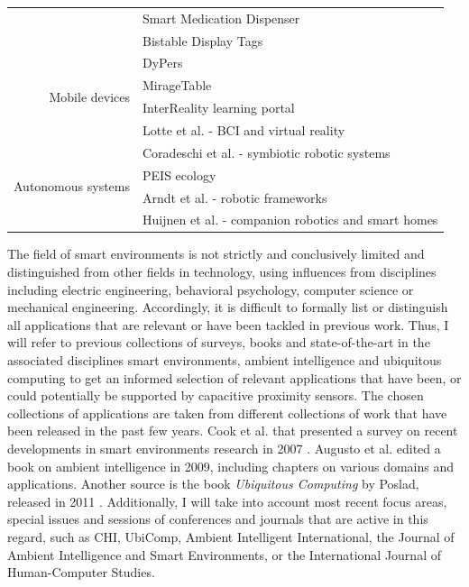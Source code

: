 \begin{table}[htbp]
\begin{tabular}{rl}
          & Smart Medication Dispenser \cite{tsai2011smart} \\
          & Bistable Display Tags \cite{dementyev2013wirelessly} \\[1em]
    \multirow{4}[0]{*}{Mobile devices} & DyPers \cite{jebara1998dypers} \\
          & MirageTable \cite{benko2012miragetable} \\
          & InterReality learning portal \cite{pena2012towards} \\
          & Lotte et al. - BCI and virtual reality \cite{lotte2013combining} \\[1em]
    \multirow{4}[0]{*}{Autonomous systems} & Coradeschi et al. - symbiotic robotic systems \cite{coradeschi2006symbiotic} \\
          & PEIS ecology \cite{broxvall2006peis} \\
          & Arndt et al. - robotic frameworks \cite{arndt2013performance} \\
          & Huijnen et al. - companion robotics and smart homes \cite{huijnen2011maybe} \\
    \bottomrule
    \end{tabular}%
  \label{tab:rel_se_apps}%
\end{table}

The field of smart environments is not strictly and conclusively limited and distinguished from other fields in technology, using influences from disciplines including electric engineering, behavioral psychology, computer science or mechanical engineering. Accordingly, it is difficult to formally list or distinguish all applications that are relevant or have been tackled in previous work. Thus, I will refer to previous collections of surveys, books and state-of-the-art in the associated disciplines smart environments, ambient intelligence and ubiquitous computing to get an informed selection of relevant applications that have been, or could potentially be supported by capacitive proximity sensors. The chosen collections of applications are taken from different collections of work that have been released in the past few years. Cook et al. that presented a survey on recent developments in smart environments research in 2007 \cite{cook2007smart}. Augusto et al. edited a book on ambient intelligence in 2009, including chapters on various domains and applications. Another source is the book \emph{Ubiquitous Computing} by Poslad, released in 2011 \cite{poslad2011ubiquitous}. Additionally, I will take into account most recent focus areas, special issues and sessions of conferences and journals that are active in this regard, such as CHI, UbiComp, Ambient Intelligent International, the Journal of Ambient Intelligence and Smart Environments, or the International Journal of Human-Computer Studies.

